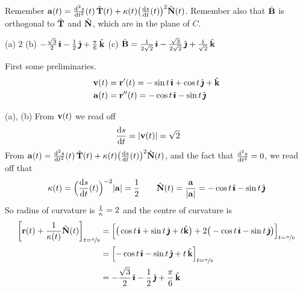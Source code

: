 \begin{hint} 
	Remember $\va(t)=\difftwo{s}{t}(t)\,\hat\vT(t)
	+\ka(t)\big(\diff{s}{t}(t)\big)^2\hat\vN(t)$. Remember also that $\hat{\mathbf{B}}$ is orthogonal to $\hat{\mathbf{T}}$ and $\hat{\mathbf{N}}$, which are in the plane of $C$.
\end{hint}

\begin{answer} 
	(a) $2$\qquad
	(b) $-\frac{\sqrt{3}}{2}\,\hat{\pmb{\imath}}-\frac{1}{2}\,\hat{\pmb{\jmath}}+\frac{\pi}{6}\,\hat{\mathbf{k}}$\qquad
	(c) $\hat{\mathbf{B}} =\frac{1}{2\sqrt{2}}\,\hat{\pmb{\imath}}
	-\frac{\sqrt{3}}{2\sqrt{2}}\,\hat{\pmb{\jmath}}
	+\frac{1}{\sqrt{2}}\,\hat{\mathbf{k}}$
\end{answer}

\begin{solution}
	First some preliminaries.
	\begin{align*}
	\mathbf{v}(t)&=\mathbf{r}'(t)=-\sin t\,\hat{\pmb{\imath}} +\cos t\,\hat{\pmb{\jmath}} + \hat{\mathbf{k}}  \\
	\mathbf{a}(t)&=\mathbf{r}''(t)= -\cos t\,\hat{\pmb{\imath}} -\sin t\,\hat{\pmb{\jmath}} 
	\end{align*}
	
	(a), (b) 
	From $\mathbf{v}(t)$ we read off
	\begin{align*}
	\diff{s}{t}=|\vv(t)|=\sqrt{2}\qquad
	\end{align*}
	From $\va(t)=\difftwo{s}{t}(t)\,\hat\vT(t)
	+\ka(t)\big(\diff{s}{t}(t)\big)^2\hat\vN(t)$, 
	and the fact that $\difftwo{s}{t}=0$, we read off that
	\begin{align*}
	\ka(t)=\Big(\diff{s}{t}(t)\Big)^{-2}|\va|=\frac{1}{2}\qquad
	\hat\vN(t) = \frac{\va}{|\va|}=-\cos t\,\hi-\sin t\,\hj
	\end{align*}
	So radius of curvature is $\frac{1}{\kappa}=2$ and the centre of  curvature is
	\begin{align*}
	\left[\mathbf{r}(t) +\frac{1}{\kappa(t)}\hat{\mathbf{N}}(t)\right]_{t=\nicefrac{\pi}{6}}
	&=\left[\big(\cos t\,\hat{\pmb{\imath}} +\sin t\,\hat{\pmb{\jmath}} + t\hat{\mathbf{k}} \big)
	+2 \big( -\cos t\,\hat{\pmb{\imath}}-\sin t\,\hat{\pmb{\jmath}}\big)\right]_{t=\nicefrac{\pi}{6}} \\
	&=\left[-\cos t\,\hat{\pmb{\imath}}
	-\sin t\,\hat{\pmb{\jmath}}
	+t\,\hat{\mathbf{k}} \right]_{t=\nicefrac{\pi}{6}} \\
	&=-\frac{\sqrt{3}}{2}\,\hat{\pmb{\imath}}-\frac{1}{2}\,\hat{\pmb{\jmath}}+\frac{\pi}{6}\,\hat{\mathbf{k}}
	\end{align*}
	

\end{solution}
